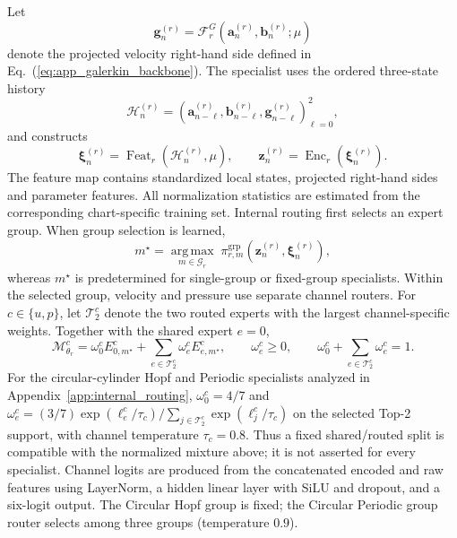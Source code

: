 \documentclass{article}
\def\plaineqref#1{\ref{#1}}
\begin{document}
Let
\begin{equation}
  \bm g_n^{(r)}
  =
  \mathcal F_r^G
  \left(
    \bm a_n^{(r)},\bm b_n^{(r)};\mu
  \right)
  \label{eq:app_galerkin_feature}
\end{equation}
denote the projected velocity right-hand side defined in Eq.~(\plaineqref{eq:app_galerkin_backbone}). The specialist uses the ordered three-state history
\begin{equation}
  \mathcal H_n^{(r)}
  =
  \left(
    \bm a_{n-\ell}^{(r)},
    \bm b_{n-\ell}^{(r)},
    \bm g_{n-\ell}^{(r)}
  \right)_{\ell=0}^{2},
  \label{eq:app_specialist_history}
\end{equation}
and constructs
\begin{equation}
  \bm\xi_n^{(r)}
  =
  \operatorname{Feat}_r
  \left(
    \mathcal H_n^{(r)},\mu
  \right),
  \qquad
  \bm z_n^{(r)}
  =
  \operatorname{Enc}_r
  \left(
    \bm\xi_n^{(r)}
  \right).
  \label{eq:app_specialist_features}
\end{equation}
The feature map contains standardized local states, projected
right-hand sides and parameter features. All normalization statistics are estimated from the corresponding chart-specific training set. Internal routing first selects an expert group. When group selection is learned,
\begin{equation}
  m^\star
  =
  \underset{m\in\mathcal G_r}{\operatorname{arg\,max}}
  \;
  \pi_{r,m}^{\mathrm{grp}}
  \left(
    \bm z_n^{(r)},\bm\xi_n^{(r)}
  \right),
  \label{eq:app_group_top1}
\end{equation}
whereas $m^\star$ is predetermined for single-group or fixed-group
specialists. Within the selected group, velocity and pressure use separate channel routers. For $c\in\{u,p\}$, let $\mathcal T_2^c$ denote the two routed experts with the largest channel-specific weights. Together with the shared expert $e=0$,
\begin{equation}
  \mathcal M_{\theta_r}^c
  =
  \omega_0^c
  E_{0,m^\star}^c
  +
  \sum_{e\in\mathcal T_2^c}
  \omega_e^c
  E_{e,m^\star}^c,
  \qquad
  \omega_e^c\ge0,
  \qquad
  \omega_0^c+\sum_{e\in\mathcal T_2^c}\omega_e^c=1.
  \label{eq:app_channel_sparse_moe}
\end{equation}
For the circular-cylinder Hopf and Periodic specialists analyzed in Appendix~\ref{app:internal_routing}, $\omega_0^c=4/7$ and $\omega_e^c=(3/7)\exp(\ell_e^c/\tau_c)/\sum_{j\in\mathcal T_2^c}\exp(\ell_j^c/\tau_c)$ on the selected Top-2 support, with channel temperature $\tau_c=0.8$. Thus a fixed shared/routed split is compatible with the normalized mixture above; it is not asserted for every specialist. Channel logits are produced from the concatenated encoded and raw features using LayerNorm, a hidden linear layer with SiLU and dropout, and a six-logit output. The Circular Hopf group is fixed; the Circular Periodic group router selects among three groups (temperature $0.9$).
\end{document}
